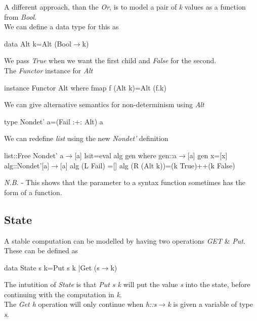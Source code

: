 \documentclass[11pt,a4paper]{article}
\begin{document}
A different approach, than the \textit{Or}, is to model a pair of \textit{k} values as a function from \textit{Bool}.\\

We can define a data type for this as
\begin{code}
data Alt k=Alt (Bool$\to$k)
\end{code}
We pass \textit{True} when we want the first child and \textit{False} for the second.\\

The \textit{Functor} instance for \textit{Alt}
\begin{code}
instance Functor Alt
  where
    fmap f (Alt k)=Alt (f.k)
\end{code}

We can give alternative semantics for non-determinism using \textit{Alt}
\begin{code}
type Nondet' a=(Fail :+: Alt) a
\end{code}

We can redefine \textit{list} using the new \textit{Nondet'} definition
\begin{code}
list::Free Nondet' a$\to$[a]
lsit=eval alg gen
  where
    gen::a$\to$[a]
    gen x=[x]
    alg::Nondet'[a]$\to$[a]
    alg (L Fail)   =[]
    alg (R (Alt k))=(k True)++(k False)
\end{code}
\textit{N.B.} - This shows that the parameter to a syntax function sometimes has the form of a function.\\

\subsection{State}

A stable computation can be modelled by having two operations \textit{GET} \& \textit{Put}.\\
These can be defined as
\begin{code}
data State s k=Put s k
              |Get (s$\to$k)
\end{code}

\remark{}
The intutition of \textit{State} is that \textit{Put s k} will put the value \textit{s} into the state, before continuing with the computation in \textit{k}.\\
The \textit{Get h} operation will only continue when \textit{h::s$\to$k} is given a variable of type \textit{s}.\\
\end{document}
